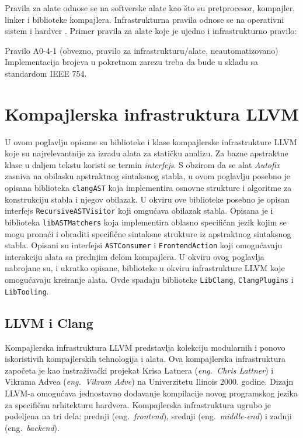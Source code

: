 \documentclass[12pt,oneside]{memoir}
\begin{document}
Pravila za alate odnose se na softverske alate kao što su pretprocesor, kompajler, linker i biblioteke kompajlera.
Infrastrukturna pravila odnose se na operativni sistem i hardver \cite{AutosarGuidelines}.
Primer pravila za alate koje je ujedno i infrastrukturno pravilo:

\begin{center}
\begin{tcolorbox}
Pravilo A0-4-1 (obvezno, pravilo za infrastrukturu/alate, neautomatizovano) \\
Implementacija brojeva u pokretnom zarezu treba da bude u skladu sa standardom IEEE 754.
\end{tcolorbox}
\end{center}





\chapter{Kompajlerska infrastruktura LLVM}
\label{chp:llvm}

U ovom poglavlju opisane su biblioteke i klase kompajlerske infrastrukture LLVM koje su najrelevantnije za izradu alata za stati\v{c}ku analizu. Za bazne apstraktne klase u daljem tekstu koristi se termin \textit{interfejs}. 
S obzirom da se alat \textit{Autofix} zasniva na obilasku apstraktnog sintaksnog stabla, u ovom poglavlju posebno je opisana biblioteka \texttt{clangAST} koja implementira osnovne
strukture i algoritme za konstrukciju stabla i njegov obilazak. U okviru ove biblioteke posebno je opisan interfejs \texttt{RecursiveASTVisitor} koji omgu\'{c}ava obilazak stabla.
Opisana je i biblioteka \texttt{libASTMatchers} koja implementira oblasno specifi\v{c}an jezik kojim se mogu prona\'{c}i i obraditi specifi\v{c}ne sintaksne strukture iz apstraktnog sintaksnog stabla.
Opisani su interfejsi \texttt{ASTConsumer} i \texttt{FrontendAction} koji omogu\'{c}avaju interakciju alata sa prednjim delom kompajlera. U okviru ovog poglavlja nabrojane su, i ukratko 
opisane, biblioteke u okviru infrastrukture LLVM koje omogu\'{c}avaju kreiranje alata. Ovde spadaju biblioteke \texttt{LibClang}, \texttt{ClangPlugins} i \texttt{LibTooling}.

\section{LLVM i Clang}

Kompajlerska infrastruktura LLVM predstavlja kolekciju modularnih i ponovo iskoristivih kompajlerskih tehnologija i alata.
Ova kompajlerska infrastruktura zapo\v{c}eta je kao instraživački projekat Krisa Latnera (\textit{eng.~Chris Lattner}) i Vikrama Advea (\textit{eng.~Vikram Adve}) na Univerzitetu Ilinois 2000. godine.
Dizajn LLVM-a omogu\'{c}ava jednostavno dodavanje kompilacije novog programskog jezika za specifi\v{c}nu arhitekturu hardvera. Kompajlerska infrastruktura
ugrubo je podeljena na tri dela: prednji (eng.~\textit{frontend}), srednji (eng.~\textit{middle-end}) i zadnji (eng.~\textit{backend}). 
\end{document}
